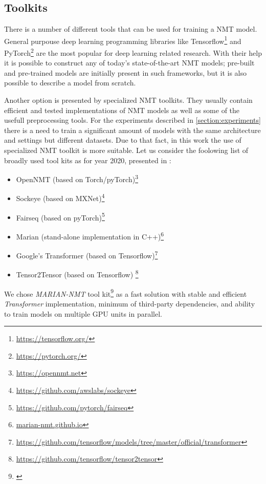\subsection{Toolkits}

There is a number of different tools that can be used for training a NMT model.
General purpouse deep learning programming libraries like
Tensorflow\footnote{\url{https://tensorflow.org/}} and
PyTorch\footnote{\url{https://pytorch.org/}} are the most popular for deep learning related
research. With their help it is possible to construct any of today's state-of-the-art
NMT models; pre-built and pre-trained models are initially present in such frameworks,
but it is also possible to describe a model from scratch.

Another option is presented by specialized NMT toolkits.
They usually contain efficient and tested implementations of NMT models as well as some of
the usefull preprocessing tools.
For the experiments described in \ref{section:experiments} there is a need to train a significant
amount of models with the same architecture and settings but different datasets.
Due to that fact, in this work the use of specialized NMT toolkit is more suitable.
Let us consider the foolowing list of broadly used tool kits as for year 2020,
presented in \cite{koehn_2020}:

\begin{itemize}
  \item OpenNMT (based on Torch/pyTorch)\footnote{\url{https://opennmt.net}}
  \item Sockeye (based on MXNet)\footnote{\url{https://github.com/awslabs/sockeye}}
  \item Fairseq (based on pyTorch)\footnote{\url{https://github.com/pytorch/fairseq}}
  \item Marian (stand-alone implementation in C++)\footnote{\url{marian-nmt.github.io}}
  \item Google's Transformer (based on Tensorflow)\footnote{\url{
    https://github.com/tensorflow/models/tree/master/official/transformer}}
  \item Tensor2Tensor (based on Tensorflow) \footnote{\url{
    https://github.com/tensorflow/tensor2tensor}}
\end{itemize}

We chose \textit{MARIAN-NMT} tool kit\footnote{\cite{mariannmt}} as a fast solution
with stable and efficient \textit{Transformer} \cite{vaswani-2017-transformer} implementation,
minimum of third-party dependencies, and ability to train models on multiple GPU units in parallel.


